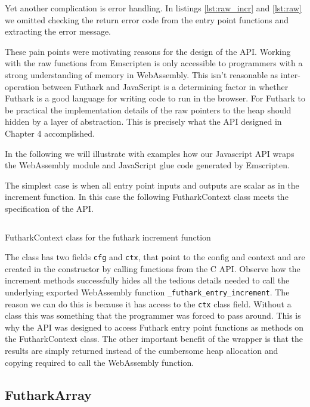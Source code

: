 \documentclass[11pt]{book}
\begin{document}
Yet another complication is error handling. In listings \ref{lst:raw_incr} and \ref{lst:raw}  we omitted checking the return error code from the entry point functions and extracting the error message. 

These pain points were motivating reasons for the design of the API. Working with the raw functions from Emscripten is only accessible to programmers with a strong understanding of memory in WebAssembly. This isn't reasonable as inter-operation between Futhark and JavaScript is a determining factor in whether Futhark is a good language for writing code to run in the browser. For Futhark to be practical the implementation details of the raw pointers to the heap should hidden by a layer of abstraction. This is precisely what the API designed in Chapter 4 accomplished. 

In the following we will illustrate with examples how our Javascript API wraps the WebAssembly module and JavaScript glue code generated by Emscripten.

The simplest case is when all entry point inputs and outputs are scalar as in the increment function. In this case the following FutharkContext class meets the specification of the API.

\begin{listing}[H] 
        \inputminted[fontsize=\small,baselinestretch=0.5,linenos]{JavaScript}{code/compiler/api_examples/FutharkContext_incr.js}
        \caption{FutharkContext class for the futhark increment function}
        \label{lst:FutharkContext_incr}    
\end{listing} 

The class has two fields \texttt{cfg} and \texttt{ctx}, that point to the config and context and are created in the constructor by calling functions from the C API. Observe how the increment methods successfully hides all the tedious details needed to call the underlying exported WebAssembly function \texttt{\_futhark\_entry\_increment}. The reason we can do this is because it has access to the \texttt{ctx} class field. Without a class this was something that the programmer was forced to pass around. This is why the API was designed to access Futhark entry point functions as methods on the FutharkContext class. The other important benefit of the wrapper is that the results are simply returned instead of the cumbersome heap allocation and copying required to call the WebAssembly function.


\subsection{FutharkArray}
\end{document}
